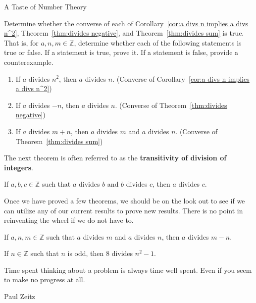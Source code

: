 \begin{section}{A Taste of Number Theory}
\begin{problem}
Determine whether the converse of each of Corollary~\ref{cor:a divs n implies a divs n^2}, Theorem~\ref{thm:divides negative}, and Theorem~\ref{thm:divides sum} is true.  That is, for $a,n,m\in\mathbb{Z}$, determine whether each of the following statements is true or false. If a statement is true, prove it. If a statement is false, provide a counterexample.
\begin{enumerate}[label=\textrm{(\alph*)}]
\item If $a$ divides $n^2$, then $a$ divides $n$. (Converse of Corollary~\ref{cor:a divs n implies a divs n^2})
\item If $a$ divides $-n$, then $a$ divides $n$. (Converse of Theorem~\ref{thm:divides negative})
\item If $a$ divides $m+n$, then $a$ divides $m$ and $a$ divides $n$. (Converse of Theorem~\ref{thm:divides sum})
\end{enumerate}
\end{problem}

The next theorem is often referred to as the \textbf{transitivity of division of integers}.

\begin{theorem}\label{thm:transitivity of divides}
If $a,b,c\in\mathbb{Z}$ such that $a$ divides $b$ and $b$ divides $c$, then $a$ divides $c$.
\end{theorem}

Once we have proved a few theorems, we should be on the look out to see if we can utilize any of our current results to prove new results.  There is no point in reinventing the wheel if we do not have to.

\begin{theorem}
If $a,n,m\in\mathbb{Z}$ such that $a$ divides $m$ and $a$ divides $n$, then $a$ divides $m-n$.
\end{theorem}

\begin{theorem}
If $n\in\mathbb{Z}$ such that $n$ is odd, then 8 divides $n^{2}-1$.
\end{theorem}

\epigraph{Time spent thinking about a problem is always time well spent. Even if you seem to make no progress at all.}{Paul Zeitz}

\end{section}